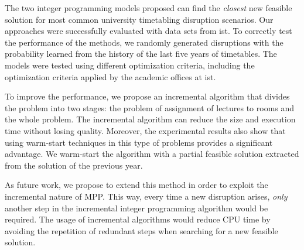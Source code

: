 \documentclass[twocolumn,natbib]{svjour3}          %
\newcommand{\uni}{\gls{ist}}
\begin{document}
The two integer programming models proposed can find the \textit{closest} new feasible solution for most common university timetabling disruption scenarios. Our approaches were successfully evaluated with data sets from \uni. To correctly test the performance of the methods, we randomly generated disruptions with the probability learned from the history of the last five years of timetables.
The models were tested using different optimization criteria, including the optimization criteria applied by the academic offices at \uni.

To improve the performance, we propose an incremental algorithm that divides the problem into two stages: the problem of assignment of lectures to rooms and the whole problem.
The incremental algorithm can reduce the size and execution time without losing quality.
Moreover, the experimental results also show that using warm-start techniques in this type of problems provides a significant advantage.
We warm-start the algorithm with a partial feasible solution extracted from the solution of the previous year.

As future work, we propose to extend this method in order to exploit the incremental nature of MPP. This way, every time a new disruption arises, {\em only} another step in the incremental integer programming algorithm would be required. The usage of incremental algorithms would reduce CPU time by avoiding the repetition of redundant steps when searching for a new feasible solution.








 
\end{document}

